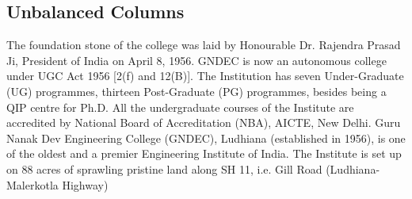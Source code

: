 \documentclass{article}
\begin{document}
\subsection*{Unbalanced Columns}

\begin{multicols*}{2}
The foundation stone of the college
was laid by Honourable Dr. Rajendra Prasad Ji, President of India on April 8,
1956. GNDEC is now an autonomous college under UGC Act 1956 [2(f) and
12(B)]. The Institution has seven Under-Graduate (UG) programmes,
thirteen Post-Graduate (PG) programmes, besides being a QIP centre for
Ph.D. All the undergraduate courses of the Institute are accredited by
National Board of Accreditation (NBA), AICTE, New Delhi. 	Guru Nanak Dev Engineering College (GNDEC), Ludhiana (established in
1956), is one of the oldest and a premier Engineering Institute of India. The
Institute is set up on 88 acres of sprawling pristine land along SH 11, i.e. Gill
Road (Ludhiana-Malerkotla Highway)
\end{multicols*}
\end{document}
